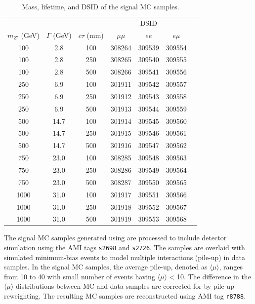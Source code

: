 \begin{table}[!htb]
  \centering
  \begin{tabular}{ c c c c c c c }
    \hline
    \hline
           &   &    & \multicolumn{3}{c}{DSID}                 \\
    $m_{Z'}$ (GeV) & $\Gamma$ (GeV) & $c\tau$ (mm) &$\mu\mu$ & $ee$ & $e\mu$ \\
    \hline
    100			   &	2.8         &   100	& 308264	& 309539		&	309554		\\
    100			   &	2.8         &   250	& 308265	& 309540		&	309555		\\
    100			   &	2.8         &   500	& 308266	& 309541		&	309556		\\
    250			   &   6.9	        &   100	& 301911	& 309542		&	309557		\\
    250			   &	6.9         &   250	& 301912	& 309543		&	309558		\\
    250			   &	6.9         &   500	& 301913	& 309544		&	309559		\\
    500			   &   14.7         &   100	& 301914	& 309545		&	309560		\\
    500			   &	14.7        &   250	& 301915	& 309546		&	309561		\\
    500			   &	14.7        &   500	& 301916	& 309547		&	309562		\\
    750			   &	23.0        &   100	& 308285	& 309548		&	309563		\\
    750			   &	23.0        &   250	& 308286	& 309549		&	309564		\\
    750			   &	23.0        &   500	& 308287	& 309550		&	309565		\\
    1000	       &	31.0        &   100	& 301917	& 309551		&	309566		\\
    1000	       &	31.0        &   250	& 301918	& 309552		&	309567		\\
    1000	       &	31.0        &   500	& 301919	& 309553		&	309568		\\
    \hline
    \hline
  \end{tabular}
  \caption{Mass, lifetime, and DSID of the signal MC samples.}
  \label{table:MC_signal_samples}
\end{table}

The signal MC samples generated using \pythia are processed to include detector simulation using the AMI tags \texttt{s2698} and \texttt{s2726}. The samples are overlaid with simulated minimum-bias events to model multiple interactions (pile-up) in data samples. In the signal MC samples, the average pile-up, denoted as $\langle\mu\rangle$, ranges from 10 to 40 with small number of events having $\langle\mu\rangle$ < 10. The difference in the $\langle\mu\rangle$ distributions between MC and data samples are corrected for by pile-up reweighting. The resulting MC samples are reconstructed using AMI tag \texttt{r8788}.

